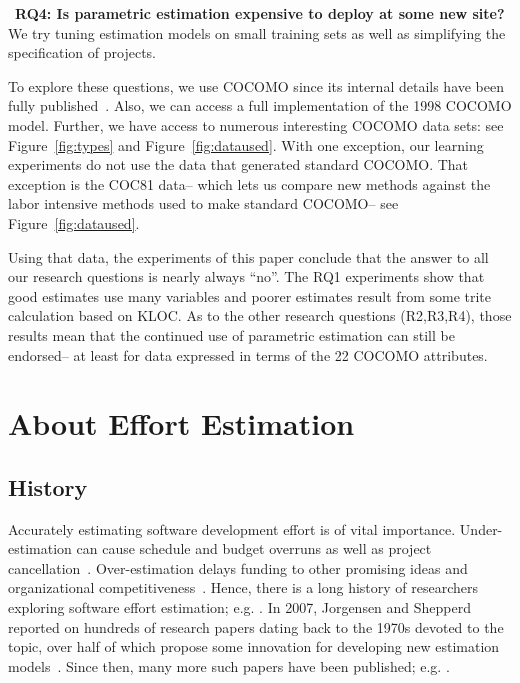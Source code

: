 \documentclass[smallcondesed]{svjour3}
\newcommand{\fig}[1]{Figure~\ref{fig:#1}}
\begin{document}
~{\bf RQ4: Is parametric estimation expensive to deploy  at some new site?}
We try   tuning estimation models on  small training sets 
as well as simplifying the specification of  projects.

 
 
To explore these questions, we use  COCOMO since its
internal details have been fully
published~\cite{boehm00b}. Also, we can access a full implementation of the  1998
COCOMO model.
Further, we have access to numerous interesting  COCOMO data
sets: see \fig{types} and \fig{dataused}.
With one exception, our learning experiments do not use the data
that generated   standard COCOMO.
That exception is the  COC81 data-- which  lets us  compare new methods
against the  labor intensive methods used to make standard COCOMO-- see 
\fig{dataused}.
 
 
Using that data,  the experiments of this paper conclude that
the answer to all  our  research questions is nearly always
``no''.  
The RQ1 experiments show that good estimates use many variables
and  poorer estimates result from   some trite calculation based on KLOC.   
%
As to the other research questions (R2,R3,R4), those results mean that 
the continued
use of parametric estimation can still be endorsed-- at least for data expressed
in terms of the 22 COCOMO attributes. 



 \section{About Effort Estimation}
 \subsection{History}

Accurately estimating software development
effort  is of vital
importance. 
Under-estimation can cause schedule and budget
overruns as well as project
cancellation~\cite{CLCS03}.  Over-estimation delays
funding to other promising ideas and
organizational competitiveness~\cite{koc11a}.
Hence, there is a long history
of researchers exploring software effort estimation; e.g. \cite{wol74,frei79,putnam76,black77,herd77,watson77,jensen83,park88,boehm81,Walkerden1999,shepperd97,jorgensen05,me06d,burgess01}.
In 2007, Jorgensen and Shepperd
reported on hundreds of research papers dating back to the 1970s devoted to
the topic, over half of which propose some innovation
for developing new estimation
models~\cite{jorgensen05}. Since then,
many more such papers have been published;
e.g. \cite{lokan06,cora10,minku14,Li2007,Li2009a,keung2008a,keung2008b,keung2008c,koc11b,me12a,me13a,kocaguneli2014transfer}.
\end{document}
